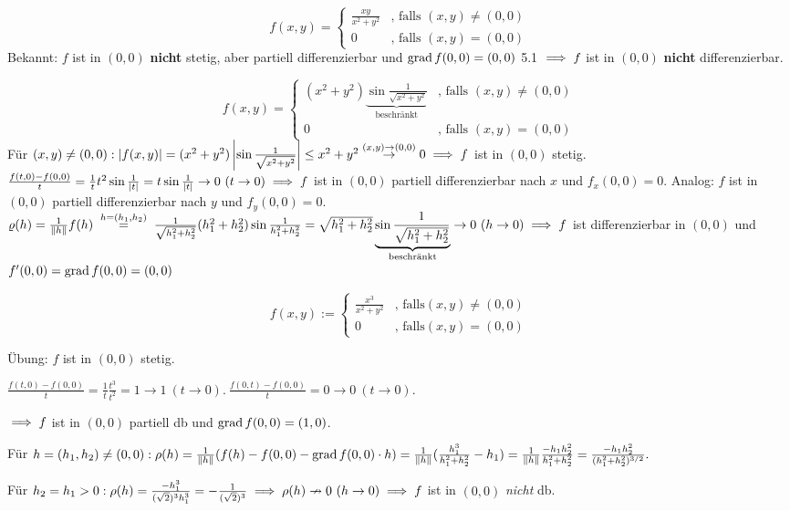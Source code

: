 \documentclass[a4paper,oneside,DIV15,BCOR12mm,chapterprefix=true,headings=onelinechapter]{scrbook}
\begin{document}
\begin{beispiele}
\item $$f(x,y)=\begin{cases}
\frac{xy}{x^2+y^2}&\text{, falls } (x,y)\ne(0,0)\\
0&\text{, falls } (x,y)=(0,0)
\end{cases}$$
Bekannt: $f$ ist in $(0,0)$ \textbf{nicht} stetig, aber partiell differenzierbar und $\mathop{\rm grad}\nolimits f(0,0)=(0,0)$ 5.1 $\implies f$ ist in $(0,0)$ \textbf{nicht} differenzierbar.
\item \[
    f(x,y)=
    \begin{cases}
        (x^2+y^2) \underbrace{\sin\frac{1}{\sqrt{x^2+y^2}}}_\text{beschränkt}&\text{, falls } (x,y)\ne(0,0)\\
        0&\text{, falls }(x,y)=(0,0)
    \end{cases}
\]
Für $(x,y)\ne(0,0): \left|f(x,y)\right|=(x^2+y^2)\left|\sin\frac{1}{\sqrt{x^2+y^2}}\right|
\le x^2+y^2\overset{(x,y)\to(0,0)}{\to}0 \implies f$ ist in $(0,0)$ stetig. 
$\frac{f(t,0)-f(0,0)}{t}=\frac{1}{t}t^2\sin\frac{1}{|t|}=t\sin\frac{1}{|t|}\to 0\ (t\to 0)\implies f$ ist in $(0,0)$ partiell differenzierbar nach $x$ und $f_x(0,0)=0$. Analog: $f$ ist in $(0,0)$ partiell differenzierbar nach $y$ und $f_y(0,0)=0$. $\varrho(h)=\frac{1}{\|h\|}f(h)\gleichwegen{h=(h_1,h_2)}\frac{1}{\sqrt{h_1^2+h_2^2}}(h_1^2+h_2^2)\sin\frac{1}{h_1^2+h_2^2}=\sqrt{h_1^2+h_2^2}\underbrace{\sin\frac{1}{\sqrt{h_1^2+h_2^2}}}_{\text{beschränkt}}\to 0\ (h\to 0)\folgt f$ ist differenzierbar in $(0,0)$ und $f'(0,0)=\mathop{\rm grad}\nolimits f(0,0)=(0,0)$

\item $$f(x,y) := \begin{cases}
\frac{x^3}{x^2+y^2}&\text{, falls} (x,y) \ne (0,0)\\
0&\text{, falls} (x,y) = (0,0)\end{cases}$$

Übung: $f$ ist in $(0,0)$ stetig.

$\frac{f(t,0) - f(0,0)}{t} = \frac{1}{t} \frac{t^3}{t^2} = 1 \to 1\ (t \to 0).\ \frac{f(0,t) - f(0,0)}{t} = 0 \to 0\ (t \to 0)$.

$\implies f$ ist in $(0,0)$ partiell db und $\mathop{\rm grad}\nolimits f(0,0) = (1,0)$.

Für $h = (h_1,h_2) \ne (0,0): \rho(h) = \frac{1}{\|h\|}(f(h) - f(0,0) - \mathop{\rm grad}\nolimits f(0,0)\cdot h) = \frac{1}{\|h\|} (\frac{h_1^3}{h_1^2+h_2^2} - h_1) = \frac{1}{\|h\|} \frac{-h_1 h_2^2}{h_1^2 + h_2^2} =  \frac{-h_1 h_2^2}{(h_1^2 + h_2^2)^{3/2}}.$

Für $h_2 = h_1 > 0: \rho(h) = \frac{-h_1^3}{(\sqrt{2})^3 h_1^3} = - \frac{1}{(\sqrt{2})^3} \implies \rho(h) \nrightarrow 0\ (h \to 0) \implies f$ ist in $(0,0)$ \emph{nicht} db.
\end{beispiele}
\end{document}

